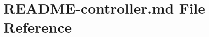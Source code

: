 \hypertarget{README-controller_8md}{}\section{R\+E\+A\+D\+M\+E-\/controller.md File Reference}
\label{README-controller_8md}
